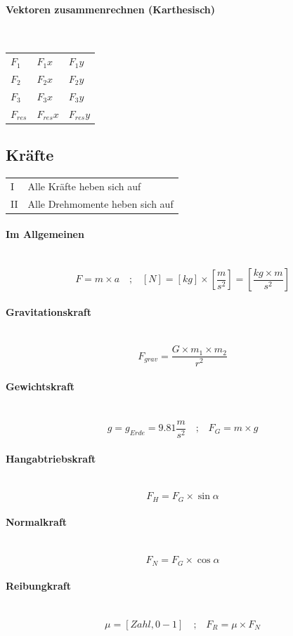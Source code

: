 \documentclass[a4paper,10pt]{article}
\newcommand{\lbparagraph}[1]{\paragraph{#1}\mbox{}\\}
\newcommand{\eqsp}[1]{\quad\textbf{;}\quad}
\begin{document}
\lbparagraph{Vektoren zusammenrechnen (Karthesisch)}

\begin{tabular}{l|l|l}		
  $F_1$ & $F_1x$ & $F_1y$ \\			
  $F_2$ & $F_2x$ & $F_2y$ \\			
  $F_3$ & $F_3x$ & $F_3y$ \\
  \hline
  $F_{res}$ & $F_{res}x$ & $F_{res}y$ \\
\end{tabular}

\subsection{Kräfte}

\begin{tabular}{l|l}
    I & Alle Kräfte heben sich auf \\
    II & Alle Drehmomente heben sich auf
\end{tabular}

\lbparagraph{Im Allgemeinen}

\begin{equation}
    F = m \times a
    \eqsp{}
    [N] = [kg] \times [\frac{m}{s^2}] = [\frac{kg \times m}{s^2}]
\end{equation}

\lbparagraph{Gravitationskraft}

\begin{equation}
    F_{grav} = \frac{G \times m_1 \times m_2}{r^2}
\end{equation}

\lbparagraph{Gewichtskraft}

\begin{equation}
    g = g_{Erde} = 9.81\frac{m}{s^2}
    \eqsp{}
    F_G = m \times g
\end{equation}

\lbparagraph{Hangabtriebskraft}

\begin{equation}
    F_H = F_G \times{\sin{\alpha}}
\end{equation}

\lbparagraph{Normalkraft}

\begin{equation}
    F_N = F_G \times \cos{\alpha}
\end{equation}

\lbparagraph{Reibungkraft}

\begin{equation}
    \mu = [Zahl, 0 - 1]
    \eqsp{}
    F_R = \mu \times F_N
\end{equation}
\end{document}

